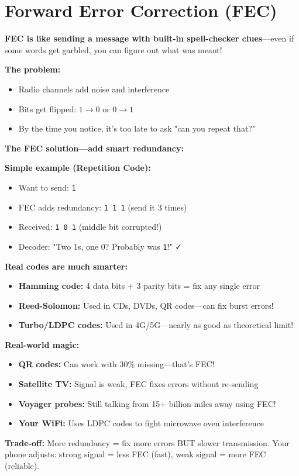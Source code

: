 \chapter{Forward Error Correction (FEC)}
\label{ch:fec}

\begin{nontechnical}
\textbf{FEC is like sending a message with built-in spell-checker clues}---even if some words get garbled, you can figure out what was meant!

\textbf{The problem:}
\begin{itemize}
\item Radio channels add noise and interference
\item Bits get flipped: $1 \rightarrow 0$ or $0 \rightarrow 1$
\item By the time you notice, it's too late to ask "can you repeat that?"
\end{itemize}

\textbf{The FEC solution---add smart redundancy:}

\textbf{Simple example (Repetition Code):}
\begin{itemize}
\item Want to send: \texttt{1}
\item FEC adds redundancy: \texttt{1 1 1} (send it 3 times)
\item Received: \texttt{1 0 1} (middle bit corrupted!)
\item Decoder: "Two 1s, one 0? Probably was \texttt{1}!" ✓
\end{itemize}

\textbf{Real codes are much smarter:}
\begin{itemize}
\item \textbf{Hamming code:} 4 data bits + 3 parity bits = fix any single error
\item \textbf{Reed-Solomon:} Used in CDs, DVDs, QR codes---can fix burst errors!
\item \textbf{Turbo/LDPC codes:} Used in 4G/5G---nearly as good as theoretical limit!
\end{itemize}

\textbf{Real-world magic:}
\begin{itemize}
\item \textbf{QR codes:} Can work with 30\% missing---that's FEC!
\item \textbf{Satellite TV:} Signal is weak, FEC fixes errors without re-sending
\item \textbf{Voyager probes:} Still talking from 15+ billion miles away using FEC!
\item \textbf{Your WiFi:} Uses LDPC codes to fight microwave oven interference
\end{itemize}

\textbf{Trade-off:} More redundancy = fix more errors BUT slower transmission. Your phone adjusts: strong signal = less FEC (fast), weak signal = more FEC (reliable).
\end{nontechnical}

